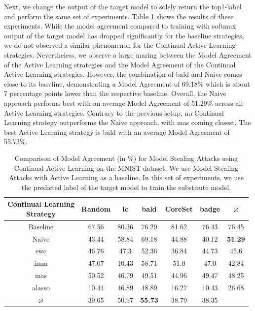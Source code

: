 Next, we change the output of the target model to solely return the top1-label and perform the same set of experiments. Table \ref{fig:ModelStealingMNISTLabel} shows the results of these experiments. While the model agreement compared to training with softmax output of the
target model has dropped significantly for the baseline strategies, we do not observed a similar phenomenon for the Continual Active Learning strategies. Nevertheless, we observe a large maring between the Model Agreement of the Active Learning strategies and the Model Agreement
of the Continual Active Learning strategies. However, the combination of \gls{bald} and Naive comes close to its baseline, demonstrating a Model Agreement of 69.18\% which is about 7 percentage points lower than the respective baseline. Overall, the Naive approach performs best with an
average Model Agreement of 51.29\% across all Active Learning strategies. Contrary to the previous setup, no Continual Learning strategy outperforms the Naive approach, with \gls{mas} coming closest. The best Active Learning strategy is \gls{bald} with an average Model Agreement of 55.73\%. \par 

\begin{table}[h]
    \centering
    \begin{tabular}{c | c c c c c | c} 
        \hline
        \diagbox[width=11em]{Active \\ Learning Strategy}{Continual Learning \\ Strategy} & Random & \gls{lc} & \gls{bald} & CoreSet & \gls{badge} & $\varnothing$ \\ 
        \hline 
        Baseline & 67.56 & 80.36 & 76.29 & 81.62 & 76.43 & 76.45\\
        \hline
        Naive & 43.44 & 58.84 & 69.18 & 44.88 & 40.12 & \textbf{51.29}\\
        \gls{ewc} &  46.76 & 47.3 & 52.36 & 36.84 & 44.73 & 45.6\\
        \gls{imm} & 47.07 & 10.43 & 58.71 & 51.0 & 47.0 & 42.84\\
        \gls{mas} & 50.52 & 46.79 & 49.51 & 44.96 & 49.47 & 48.25\\
        \gls{alasso} &  10.44 & 46.89 & 48.89 & 16.27 & 10.43 & 26.68\\
        \hline
        $\varnothing$ & 39.65 & 50.97 & \textbf{55.73} & 38.79 & 38.35\\
        \hline
    \end{tabular}
    \caption[Model agreement of Continual Learning strategies on MNIST using the predicted class label]{Comparison of Model Agreement (in \%) for Model Stealing Attacks using Continual Active Learning on the MNIST dataset. We use Model Stealing Attacks with Active Learning as a baseline.
    In this set of experiments, we use the predicted label of the target model to train the substitute model.}
    \label{fig:ModelStealingMNISTLabel}
\end{table}

